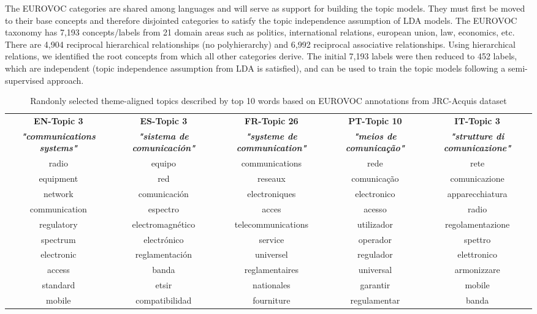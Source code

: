 The EUROVOC categories are shared among languages and will serve as support for building the topic models. They must first be moved to their base concepts and therefore disjointed categories to satisfy the topic independence assumption \citep{Blei2003} of LDA models. The EUROVOC taxonomy has 7,193 concepts/labels from 21 domain areas such as politics, international relations, european union, law, economics, etc. There are 4,904 reciprocal hierarchical relationships (no polyhierarchy) and 6,992 reciprocal associative relationships. Using hierarchical relations, we identified the root concepts from which all other categories derive. The initial 7,193 labels were then reduced to 452 labels, which are independent (topic independence assumption from LDA is satisfied), and can be used to train the topic models following a semi-supervised approach. 

\begin{table}[ht]\centering
  \small
  \noindent
  \begin{tabularx}{\linewidth}{@{} CCCCC @{}}
  \hline
 \textbf{EN-Topic 3} & \textbf{ES-Topic 3} & \textbf{FR-Topic 26} & \textbf{PT-Topic 10} & \textbf{IT-Topic 3}  \\
\textbf{\textit{{\scriptsize "communications systems"}}} & \textbf{\textit{{\scriptsize "sistema de comunicaci\'on"}}} & \textbf{\textit{{\scriptsize "systeme de communication"}}} & \textbf{\textit{{\scriptsize "meios de comunicação"}}} & \textbf{\textit{{\scriptsize "strutture di comunicazione"}}} \\ 
  \hline
     radio          & equipo                & communications		& rede         & rete        \\
     equipment      & red                   & reseaux            & comunicação   & comunicazione        \\
     network        & comunicaci\'on        & electroniques      & electronico    & apparecchiatura        \\
     communication  & espectro              & acces              & acesso    & radio        \\
     regulatory     & electromagn\'etico    & telecommunications & utilizador & regolamentazione            \\
     spectrum       & electr\'onico         & service            & operador & spettro           \\
     electronic     & reglamentaci\'on      & universel          & regulador    & elettronico                  \\
     access         & banda                 & reglamentaires     & universal        & armonizzare        \\
     standard       & etsir                 & nationales         & garantir   & mobile         \\
     mobile         & compatibilidad        & fourniture         & regulamentar  & banda          \\
    \bottomrule
  \end{tabularx}
\caption{Randonly selected theme-aligned topics described by top 10 words based on EUROVOC annotations from JRC-Acquis dataset}
\label{tb:topics}
\end{table}

